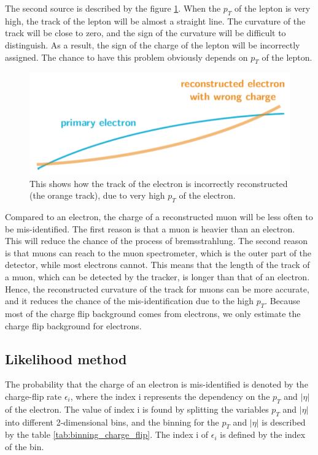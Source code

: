 The second source is described by the figure \ref{fig:charge_flip_high_pt}.
When the $p_T$ of the lepton is very high, the track of the lepton will be almost a straight line.
The curvature of the track will be close to zero, and the sign of the curvature will be difficult to distinguish.
As a result, the sign of the charge of the lepton will be incorrectly assigned.
The chance to have this problem obviously depends on $p_T$ of the lepton.

\begin{figure}
\centering
\includegraphics[width=\textwidth]{data/photo/charge_flip/WrongTrack.png}
\caption{This shows how the track of the electron is incorrectly reconstructed (the orange track), due to very high $p_T$ of the electron.}
\label{fig:charge_flip_high_pt}
\end{figure}

Compared to an electron, the charge of a reconstructed muon will be less often to be mis-identified.
The first reason is that a muon is heavier than an electron.
This will reduce the chance of the process of bremsstrahlung.
The second reason is that muons can reach to the muon spectrometer, which is the outer part of the detector, while most electrons cannot.
This means that the length of the track of a muon, which can be detected by the tracker, is longer than that of an electron.
Hence, the reconstructed curvature of the track for muons can be more accurate, and it reduces the chance of the mis-identification due to the high $p_T$.
Because most of the charge flip background comes from electrons, we only estimate the charge flip background for electrons.

\subsection{Likelihood method}
\label{sec:likelihood_method}
The probability that the charge of an electron is mis-identified is denoted by the charge-flip rate $\epsilon_i$, where the index i represents the dependency on the $p_T$ and $|\eta|$ of the electron.
The value of index i is found by splitting the variables $p_T$ and $|\eta|$ into different 2-dimensional bins, and the binning for the $p_T$ and $|\eta|$ is described by the table \ref{tab:binning_charge_flip}. The index i of $\epsilon_i$ is defined by the index of the bin.

